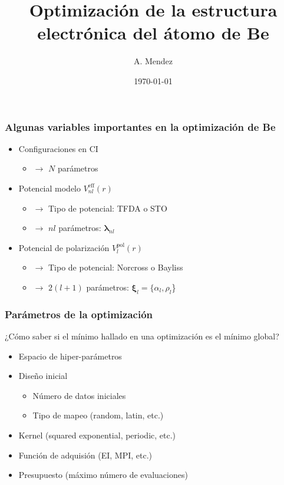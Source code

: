 \documentclass{beamer}
\title{Optimización de la estructura electrónica del átomo de Be}
\author{A. Mendez}
\date{\today} %
\begin{document}
\frame{\titlepage}
\begin{frame}
\frametitle{Algunas variables importantes en la optimización de Be}
\begin{itemize}
\item Configuraciones en CI 
  \begin{itemize}
    \item[ ] $\rightarrow$ $N$ parámetros
  \end{itemize}
\item Potencial modelo $V_{nl}^{\textrm{eff}}(r)$ 
  \begin{itemize}
    \item[ ] $\rightarrow$ Tipo de potencial: TFDA o STO
    \item[ ] $\rightarrow$ $nl$ parámetros: $\boldsymbol{\lambda}_{nl}$ 
  \end{itemize}
\item Potencial de polarización $V_l^{\textrm{pol}}(r)$ 
  \begin{itemize}
    \item[ ] $\rightarrow$ Tipo de potencial: Norcross o Bayliss
    \item[ ] $\rightarrow$ $2(l+1)$ parámetros: $\boldsymbol{\xi}_l=\{\alpha_l,\rho_l$\} 
  \end{itemize}
\end{itemize}
\end{frame}
\begin{frame}
\frametitle{Parámetros de la optimización}

\begin{center}
¿Cómo saber si el mínimo hallado en una optimización es el mínimo global?
\end{center}

\begin{itemize}
\item Espacio de hiper-parámetros
\item Diseño inicial
  \begin{itemize}
    \item Número de datos iniciales
    \item Tipo de mapeo (random, latin, etc.)
  \end{itemize}
\item Kernel (squared exponential, periodic, etc.)
\item Función de adquisión (EI, MPI, etc.)
\item Presupuesto (máximo número de evaluaciones)
\end{itemize}

\end{frame}
\end{document}
